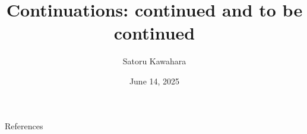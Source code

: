 \documentclass[unicode,compress,14pt,CJK,aspectratio=169,xcolor={dvipsnames},t%
  \directlua{
    handout = os.getenv"HANDOUT"
    local _ = handout and tex.print(",handout")
}]{beamer}
\title{Continuations: continued and to be continued}
\author{Satoru Kawahara}
\date{June 14, 2025}
\institute{関数型まつり2025}
\begin{document}

% 



% 
% 
% 

\switchfooter
\begin{frame}[allowframebreaks]{References}
	\printbibliography
\end{frame}
\end{document}
